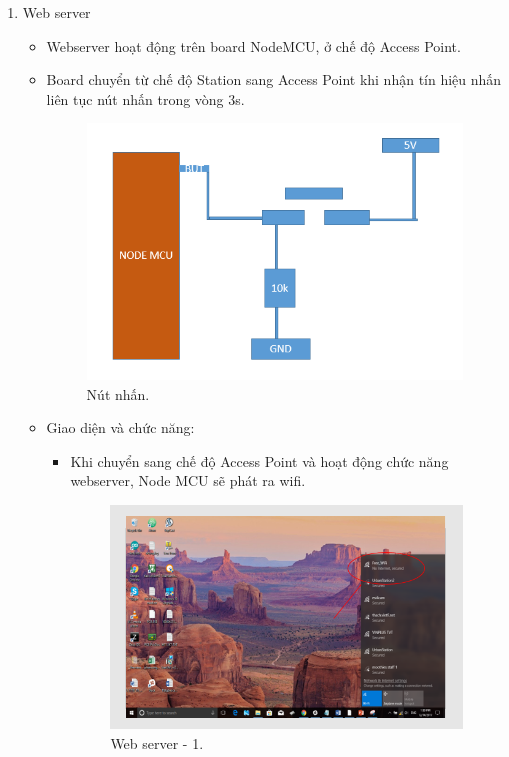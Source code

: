 \documentclass[a4paper,12pt,oneside]{article}
\begin{document}
\begin{enumerate}
	\item Web server
	\begin{itemize}
		\item Webserver hoạt động trên board NodeMCU, ở chế độ Access Point.
		\item Board chuyển từ chế độ Station sang Access Point khi nhận tín hiệu nhấn liên tục nút nhấn trong vòng 3s.
			\begin{figure}[H]
			\centering
			\includegraphics[scale=.7]{hinh/node_button.PNG}
			\caption{Nút nhấn.}
			\end{figure}
		\item Giao diện và chức năng:
		\begin{itemize}
			\item Khi chuyển sang chế độ Access Point và hoạt động chức năng webserver, Node MCU sẽ phát ra wifi.
			\begin{figure}[H]
			\centering
			\includegraphics[scale=.7]{hinh/webserver_1.PNG}
			\caption{Web server - 1.}
			\end{figure}
			

\end{itemize}
\end{itemize}
\end{enumerate}
\end{document}
